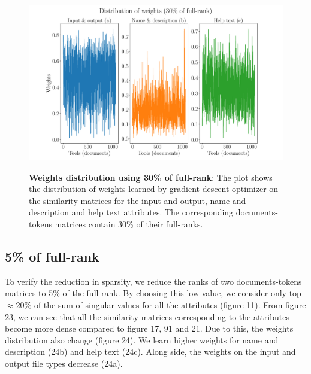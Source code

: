 \begin{figure}[h]
\begin{centering}
    {\includegraphics[scale=0.35]{figures/Weights_030.pdf}}
    \caption[Weights distribution 30\% rank]{\textbf{Weights distribution using 30\% of full-rank}: The plot shows the distribution of weights learned by gradient descent optimizer on the similarity matrices for the input and output, name and description and help text attributes. The corresponding documents-tokens matrices contain 30\% of their full-ranks.}
\end{centering}
\end{figure}

\subsection{5\% of full-rank}
To verify the reduction in sparsity, we reduce the ranks of two documents-tokens matrices to 5\% of the full-rank. By choosing this low value, we consider only top $\approx 20\%$ of the sum of singular values for all the attributes (figure 11). From figure 23, we can see that all the similarity matrices corresponding to the attributes become more dense compared to figure 17, 91 and 21. Due to this, the weights distribution also change (figure 24). We learn higher weights for name and description (24b) and help text (24c). Along side, the weights on the input and output file types decrease (24a).  


